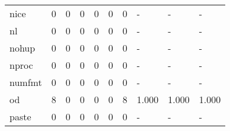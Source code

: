 \begin{longtable}{lp{1.3cm}p{1.3cm}p{1.3cm}p{1.3cm}p{1.3cm}p{1.3cm}p{1.3cm}p{1.3cm}p{1.3cm}}
nice      &                      0 &                                             0 &                                            0 &                                           0 &                                            0 &                                          0 &                                    - &                                      - &                                    - \\
nl        &                      0 &                                             0 &                                            0 &                                           0 &                                            0 &                                          0 &                                    - &                                      - &                                    - \\
nohup     &                      0 &                                             0 &                                            0 &                                           0 &                                            0 &                                          0 &                                    - &                                      - &                                    - \\
nproc     &                      0 &                                             0 &                                            0 &                                           0 &                                            0 &                                          0 &                                    - &                                      - &                                    - \\
numfmt    &                      0 &                                             0 &                                            0 &                                           0 &                                            0 &                                          0 &                                    - &                                      - &                                    - \\
od        &                      8 &                                             0 &                                            0 &                                           0 &                                            0 &                                          8 &                                1.000 &                                  1.000 &                                1.000 \\
paste     &                      0 &                                             0 &                                            0 &                                           0 &                                            0 &                                          0 &                                    - &                                      - &                                    - \\

\end{longtable}

